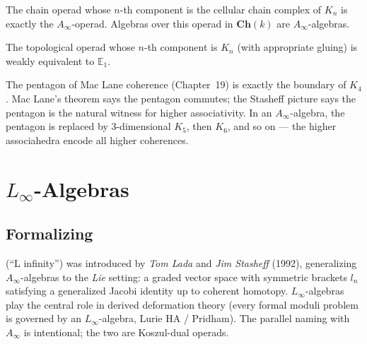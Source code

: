 \begin{theorem}
\label{thm:Ainf-operad-K}
The chain operad whose $n$-th component is the cellular chain complex
of $K_n$ is exactly the $A_\infty$-operad. Algebras over this operad
in $\mathbf{Ch}(k)$ are $A_\infty$-algebras.

The topological operad whose $n$-th component is $K_n$ (with appropriate
gluing) is weakly equivalent to $\mathbb{E}_1$.
\end{theorem}

\begin{remark}
\label{rem:mac-lane-pentagon}
The pentagon of Mac Lane coherence (Chapter~19) is exactly the
boundary of $K_4$. Mac Lane's theorem says the pentagon commutes; the
Stasheff picture says the pentagon is the natural witness for higher
associativity. In an $A_\infty$-algebra, the pentagon is replaced by
$3$-dimensional $K_5$, then $K_6$, and so on — the higher associahedra
encode all higher coherences.
\end{remark}


\section{$L_\infty$-Algebras}
\label{sec:Linf}

\subsection{Formalizing}

\begin{nameorigin}
 (``L infinity'') was introduced by
\emph{Tom Lada} and \emph{Jim Stasheff} (1992), generalizing
$A_\infty$-algebras to the \emph{Lie} setting: a graded vector space
with symmetric brackets $l_n$ satisfying a generalized Jacobi identity
up to coherent homotopy. $L_\infty$-algebras play the central role in
derived deformation theory (every formal moduli problem is governed by
an $L_\infty$-algebra, Lurie HA / Pridham). The parallel naming with
$A_\infty$ is intentional; the two are Koszul-dual operads.
\end{nameorigin}

